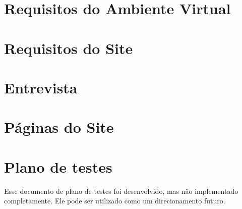 \chapter{Requisitos do Ambiente Virtual}\label{apendice}


\chapter{Requisitos do Site} \label{Apendice B}


\chapter{Entrevista}\label{ap:entrevista}


% 

\chapter{Páginas do Site}\label{apendice paginas site}
\label{ap:páginas_do_site}

\chapter{Plano de testes}\label{ap:plano de testes}
Esse documento de plano de testes foi desenvolvido, mas não implementado completamente. Ele pode ser utilizado como um direcionamento futuro.
